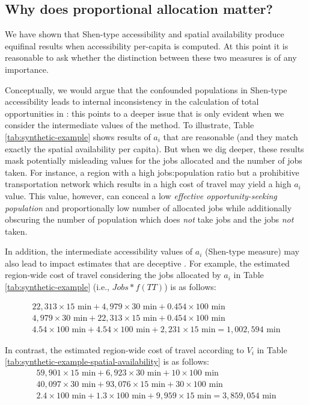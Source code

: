 \documentclass[]{elsarticle} %
\begin{document}
\hypertarget{why-does-proportional-allocation-matter}{%
\subsection{Why does proportional allocation
matter?}\label{why-does-proportional-allocation-matter}}

We have shown that Shen-type accessibility and spatial availability
produce equifinal results when accessibility per-capita is computed. At
this point it is reasonable to ask whether the distinction between these
two measures is of any importance.

Conceptually, we would argue that the confounded populations in
Shen-type accessibility leads to internal inconsistency in the
calculation of total opportunities in \citet{shen1998}: this points to a
deeper issue that is only evident when we consider the intermediate
values of the method. To illustrate, Table \ref{tab:synthetic-example}
shows results of \(a_i\) that are reasonable (and they match exactly the
spatial availability per capita). But when we dig deeper, these results
mask potentially misleading values for the jobs allocated and the number
of jobs taken. For instance, a region with a high jobs:population ratio
but a prohibitive transportation network which results in a high cost of
travel may yield a high \(a_i\) value. This value, however, can conceal
a low \emph{effective opportunity-seeking population} and proportionally
low number of allocated jobs while additionally obscuring the number of
population which does \emph{not} take jobs and the jobs \emph{not}
taken.

In addition, the intermediate accessibility values of \(a_i\) (Shen-type
measure) may also lead to impact estimates that are deceptive
\citep[see][]{sarlas_2020_betweenness}. For example, the estimated
region-wide cost of travel considering the jobs allocated by \(a_i\) in
Table \ref{tab:synthetic-example} (i.e., \(Jobs*f(TT)\)) is as follows:

\[
\begin{array}{l}
22,313\times 15 \text{ min} + 4,979\times 30 \text{ min} + 0.454\times 100 \text{ min}\\
4,979\times 30 \text{ min} + 22,313\times 15 \text{ min} + 0.454\times 100 \text{ min}\\
4.54\times 100 \text{ min} + 4.54\times 100 \text{ min} + 2,231\times 15 \text{ min} = 1,002,594\text{ min}
\end{array}
\]

In contrast, the estimated region-wide cost of travel according to
\(V_i\) in Table \ref{tab:synthetic-example-spatial-availability} is as
follows: \[
\begin{array}{l}
59,901\times 15 \text{ min} + 6,923\times 30 \text{ min} + 10\times 100 \text{ min}\\
40,097\times 30 \text{ min} + 93,076\times 15 \text{ min} + 30\times 100 \text{ min}\\
2.4\times 100 \text{ min} + 1.3\times 100 \text{ min} + 9,959\times 15 \text{ min} = 3,859,054\text{ min}
\end{array}
\]
\end{document}
